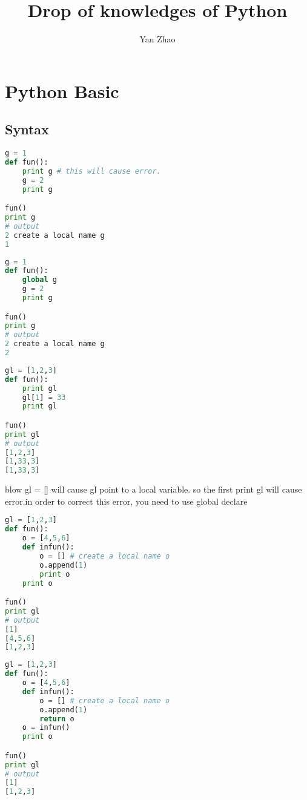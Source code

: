 \documentclass[a4paper,12pt,twoside]{book}
\begin{document}

\title{Drop of knowledges of Python}
\author{Yan Zhao}
\date{}\maketitle


	
\chapter{Python Basic}
\section{Syntax}
\begin{lstlisting}[frame=single, language=Python]
g = 1
def fun():
    print g # this will cause error. 
	g = 2
	print g

fun()
print g
# output 
2 create a local name g
1
\end{lstlisting}  

\begin{lstlisting}[frame=single, language=python]
g = 1
def fun():
	global g
	g = 2
	print g

fun()
print g
# output 
2 create a local name g
2
\end{lstlisting}  

\begin{lstlisting}[frame=single, language=python]
gl = [1,2,3]
def fun():
	print gl
	gl[1] = 33
	print gl

fun()
print gl
# output 
[1,2,3]
[1,33,3]
[1,33,3]
\end{lstlisting}  

blow gl = [] will cause gl point to a local variable. so the first print gl will cause error.in order to correct this error, you need to use global declare

\begin{lstlisting}[frame=single, language=python]
gl = [1,2,3]
def fun():
	o = [4,5,6]
	def infun():
		o = [] # create a local name o
		o.append(1)
		print o
	print o

fun()
print gl
# output 
[1]
[4,5,6]
[1,2,3]
\end{lstlisting}  

\begin{lstlisting}[frame=single, language=python]
gl = [1,2,3]
def fun():
	o = [4,5,6]
	def infun():
		o = [] # create a local name o
		o.append(1)
		return o
	o = infun()
	print o

fun()
print gl
# output 
[1]
[1,2,3]
\end{lstlisting}  
\end{document}
